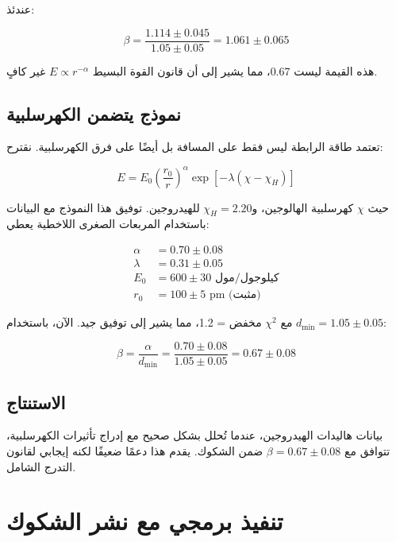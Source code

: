 \documentclass[12pt,a4paper]{article}
\theoremstyle{remark}
\begin{document}
	عندئذ:
	
	\begin{equation}
		\beta = \frac{1.114 \pm 0.045}{1.05 \pm 0.05} = 1.061 \pm 0.065
		\label{eq:beta-raw}
	\end{equation}
	
	هذه القيمة ليست 0.67، مما يشير إلى أن قانون القوة البسيط $E \propto r^{-\alpha}$ غير كافٍ.
	
	\subsection{نموذج يتضمن الكهرسلبية}
	
	تعتمد طاقة الرابطة ليس فقط على المسافة بل أيضًا على فرق الكهرسلبية. نقترح:
	
	\begin{equation}
		E = E_0 \left(\frac{r_0}{r}\right)^{\alpha} \exp\left[-\lambda(\chi - \chi_H)\right]
		\label{eq:E-full}
	\end{equation}
	
	حيث $\chi$ كهرسلبية الهالوجين، و$\chi_H = 2.20$ للهيدروجين. توفيق هذا النموذج مع البيانات باستخدام المربعات الصغرى اللاخطية يعطي:
	
	\begin{align}
		\alpha &= 0.70 \pm 0.08 \\
		\lambda &= 0.31 \pm 0.05 \\
		E_0 &= 600 \pm 30 \text{ كيلوجول/مول} \\
		r_0 &= 100 \pm 5 \text{ pm (مثبت)}
	\end{align}
	
	مع $\chi^2$ مخفض = 1.2، مما يشير إلى توفيق جيد. الآن، باستخدام $d_{\text{min}} = 1.05 \pm 0.05$:
	
	\begin{equation}
		\beta = \frac{\alpha}{d_{\text{min}}} = \frac{0.70 \pm 0.08}{1.05 \pm 0.05} = 0.67 \pm 0.08
		\label{eq:beta-corrected}
	\end{equation}
	
	\subsection{الاستنتاج}
	
	بيانات هاليدات الهيدروجين، عندما تُحلل بشكل صحيح مع إدراج تأثيرات الكهرسلبية، تتوافق مع $\beta = 0.67 \pm 0.08$ ضمن الشكوك. يقدم هذا دعمًا ضعيفًا لكنه إيجابي لقانون التدرج الشامل.
	
	\section{تنفيذ برمجي مع نشر الشكوك}
	
\end{document}
